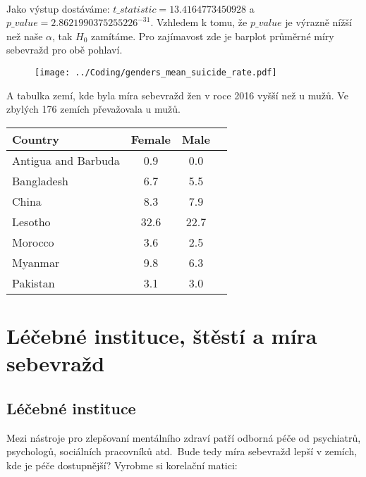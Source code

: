 \documentclass[12pt]{article}
\begin{document}
\paragraph{}
Jako výstup dostáváme: $t\_statistic = 13.4164773450928$ a $p\_value = 2.8621990375255226^{-31}$. Vzhledem k tomu, že $p\_value$ je výrazně nížší než naše $\alpha$, tak $H_0$ zamítáme. Pro zajímavost zde je barplot průměrné míry sebevražd pro obě pohlaví. 
\begin{figure}[hbt]
  \centering
  \texttt{[image: ../Coding/genders\_mean\_suicide\_rate.pdf]}
  \label{fig:plot}
\end{figure}

\newpage
A tabulka zemí, kde byla míra sebevražd žen v roce 2016 vyšší než u mužů. Ve zbylých 176 zemích převažovala u mužů.
\begin{table}[htb]
\centering
\label{tab:suicide-rates}
\begin{tabular}{lccc}
\hline
Country & Female & Male \\
\hline
Antigua and Barbuda & 0.9 & 0.0 \\
Bangladesh & 6.7 & 5.5 \\
China & 8.3 & 7.9 \\
Lesotho & 32.6 & 22.7 \\
Morocco & 3.6 & 2.5 \\
Myanmar & 9.8 & 6.3 \\
Pakistan & 3.1 & 3.0 \\
\hline
\end{tabular}
\end{table}

\section{Léčebné instituce, štěstí a míra sebevražd}
\subsection{Léčebné instituce}
	Mezi nástroje pro zlepšovaní mentálního zdraví patří odborná péče od psychiatrů, psychologů, sociálních pracovníků atd.\ Bude tedy míra sebevražd lepší v zemích, kde je péče dostupnější? Vyrobme si korelační matici: \\
\end{document}
